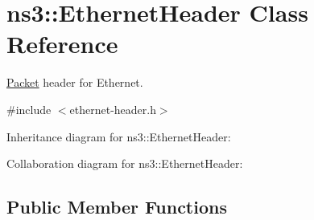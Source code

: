 \hypertarget{classns3_1_1EthernetHeader}{}\section{ns3\+:\+:Ethernet\+Header Class Reference}
\label{classns3_1_1EthernetHeader}


\hyperlink{classns3_1_1Packet}{Packet} header for Ethernet.  




{\ttfamily \#include $<$ethernet-\/header.\+h$>$}



Inheritance diagram for ns3\+:\+:Ethernet\+Header\+:


Collaboration diagram for ns3\+:\+:Ethernet\+Header\+:
\subsection*{Public Member Functions}
